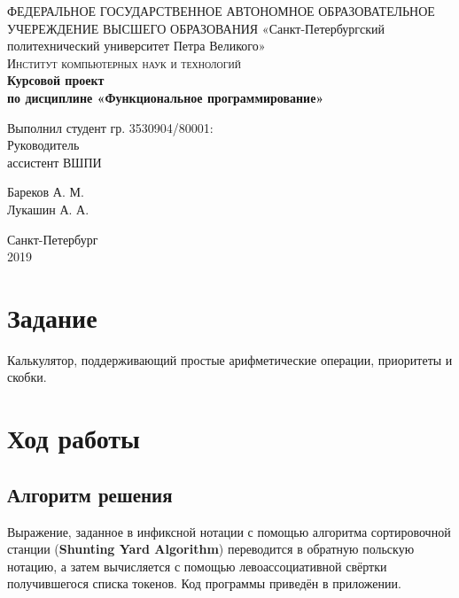 \documentclass[a4paper,11pt]{article}
\begin{document}
\lstset{style=mycode}

\begin{titlepage}
  \center
  ФЕДЕРАЛЬНОЕ ГОСУДАРСТВЕННОЕ АВТОНОМНОЕ ОБРАЗОВАТЕЛЬНОЕ УЧЕРЕЖДЕНИЕ ВЫСШЕГО ОБРАЗОВАНИЯ\linebreak  
  «Санкт-Петербургский политехнический университет Петра Великого»\\[2cm] 
  \textsc{\Large Институт компьютерных наук и технологий}\\[6.5cm]
  
  { 
    \huge \bfseries Курсовой проект\\
    по дисциплине «Функциональное программирование»
  } \\[6.5cm]

  \begin{multicols}{2}
  \begin{flushright}
    \large
    
    {Выполнил студент гр. 3530904/80001:}\\[0.5cm]
    
    {Руководитель\\
    ассистент ВШПИ}

  \end{flushright}
  \begin{flushright}
    
    {Бареков А. М.}\\[0.5cm]   
     
    Лукашин А. А.
    
  \end{flushright}
  \end{multicols}
  
  \bigskip
  \centering
  {
    Санкт-Петербург\\
    2019
  }
  \vfill
\end{titlepage}

\section{Задание}
  Калькулятор, поддерживающий простые арифметические операции, приоритеты и скобки.

\section{Ход работы}
  \subsection{Алгоритм решения}
  Выражение, заданное в инфиксной нотации с помощью алгоритма сортировочной станции (\textbf{Shunting Yard Algorithm}) переводится в
  обратную польскую нотацию, а затем вычисляется с помощью левоассоциативной свёртки получившегося списка токенов.
  Код программы приведён в приложении.
\end{document}
